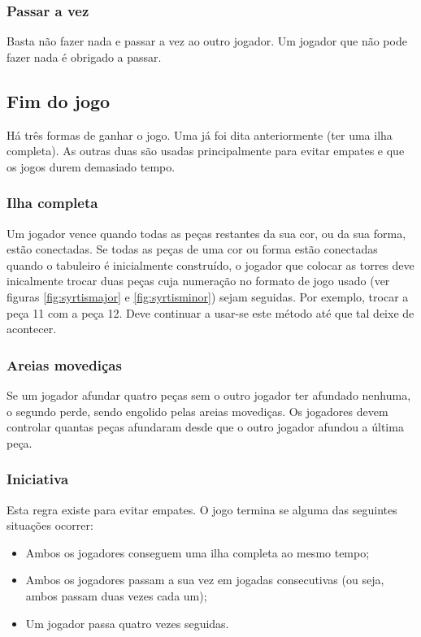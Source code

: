 \documentclass[a4paper]{article}
\begin{document}
\subsubsection{Passar a vez}

Basta não fazer nada e passar a vez ao outro jogador. Um jogador que não pode fazer nada é obrigado a passar.


\subsection{Fim do jogo}
\label{endgame}

Há três formas de ganhar o jogo. Uma já foi dita anteriormente (ter uma ilha completa). As outras duas são usadas principalmente para evitar empates e que os jogos durem demasiado tempo.

\subsubsection{Ilha completa}

Um jogador vence quando todas as peças restantes da sua cor, ou da sua forma, estão conectadas.
Se todas as peças de uma cor ou forma estão conectadas quando o tabuleiro é inicialmente construído, o jogador que colocar as torres deve inicalmente trocar duas peças cuja numeração no formato de jogo usado (ver figuras \ref{fig:syrtismajor} e \ref{fig:syrtisminor}) sejam seguidas. Por exemplo, trocar a peça 11 com a peça 12. Deve continuar a usar-se este método até que tal deixe de acontecer.

\subsubsection{Areias movediças}

Se um jogador afundar quatro peças sem o outro jogador ter afundado nenhuma, o segundo perde, sendo engolido pelas areias movediças.
Os jogadores devem controlar quantas peças afundaram desde que o outro jogador afundou a última peça.

\subsubsection{Iniciativa}

Esta regra existe para evitar empates. O jogo termina se alguma das seguintes situações ocorrer:

\begin{itemize}
\item Ambos os jogadores conseguem uma ilha completa ao mesmo tempo;
\item Ambos os jogadores passam a sua vez em jogadas consecutivas (ou seja, ambos passam duas vezes cada um);
\item Um jogador passa quatro vezes seguidas.
\end{itemize}
\end{document}
